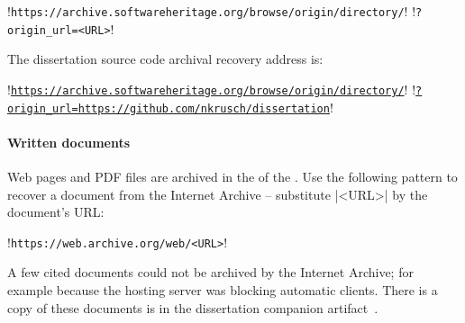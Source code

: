 \noindent\begin{minipage}{\textwidth}
\begin{browserlisting}
!\texttt{https://archive.softwareheritage.org/browse/origin/directory/}!
!\hspace{2em}\texttt{?origin\_url=<URL>}!
\end{browserlisting}
\end{minipage}

\begin{example}
The dissertation source code archival recovery address is:\mbox{}

\noindent\begin{minipage}{\textwidth}
\begin{browserlisting}
!\texttt{\href{https://archive.softwareheritage.org/browse/origin/directory/?origin_url=https://github.com/nkrusch/dissertation}{https://archive.softwareheritage.org/browse/origin/directory/}}!
!\hspace{2em}\texttt{\href{https://archive.softwareheritage.org/browse/origin/directory/?origin_url=https://github.com/nkrusch/dissertation}{?origin\_url=https://github.com/nkrusch/dissertation}}!
\end{browserlisting}
\end{minipage}
\end{example}

\paragraph*{Written documents}
Web pages and PDF files are archived in the  of the
. Use the following pattern to recover a document from the
Internet Archive -- substitute \pr|<URL>| by the document's URL\@:

\noindent\begin{minipage}{\textwidth}
\begin{browserlisting}
!\texttt{https://web.archive.org/web/<URL>}!
\end{browserlisting}
\end{minipage}

A few cited documents could not be archived by the Internet Archive; for example
because the hosting server was blocking automatic clients. There is a copy of
these documents is in the dissertation companion artifact~\cite{aicc}.

